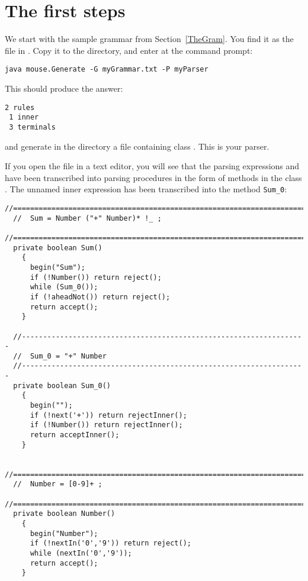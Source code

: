 
\section{The first steps}


We start with the sample grammar from Section~\ref{TheGram}.
You find it as the file  in .
Copy it to the  directory,
and enter at the command prompt:

\small
\begin{Verbatim}[samepage=true,xleftmargin=15mm,baselinestretch=0.8]
 java mouse.Generate -G myGrammar.txt -P myParser
\end{Verbatim}
\normalsize
%      
This should produce the answer: 
%      
\small
\begin{Verbatim}[samepage=true,xleftmargin=15mm,baselinestretch=0.8]
 2 rules
 1 inner
 3 terminals
\end{Verbatim}
\normalsize
%      
and generate in the  directory a file 
containing class .
This is your parser.

If you open the file in a text editor, you will see that the 
parsing expressions  and  have been transcribed
into parsing procedures in the form of methods in the class . 
The unnamed inner expression  has been transcribed
into the method \verb#Sum_0#:

\small
\begin{Verbatim}[frame=single,framesep=2mm,samepage=true,xleftmargin=15mm,xrightmargin=15mm,baselinestretch=0.8]
  //=====================================================================
  //  Sum = Number ("+" Number)* !_ ;
  //=====================================================================
  private boolean Sum()
    {
      begin("Sum");
      if (!Number()) return reject();
      while (Sum_0());
      if (!aheadNot()) return reject();
      return accept();
    }
  
  //-------------------------------------------------------------------
  //  Sum_0 = "+" Number
  //-------------------------------------------------------------------
  private boolean Sum_0()
    {
      begin("");
      if (!next('+')) return rejectInner();
      if (!Number()) return rejectInner();
      return acceptInner();
    }
  
  //=====================================================================
  //  Number = [0-9]+ ;
  //=====================================================================
  private boolean Number()
    {
      begin("Number");
      if (!nextIn('0','9')) return reject();
      while (nextIn('0','9'));
      return accept();
    }
\end{Verbatim}
\normalsize

